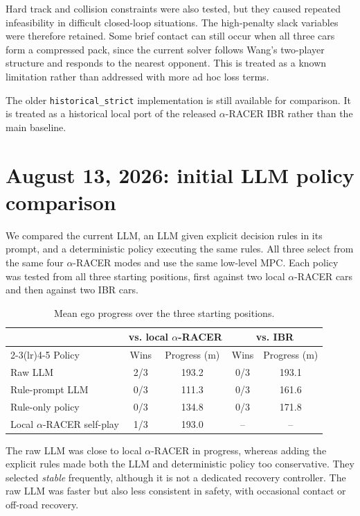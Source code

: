 \documentclass[11pt]{article}
\newcommand{\code}[1]{\texttt{#1}}
\begin{document}
Hard track and collision constraints were also tested, but they caused repeated
infeasibility in difficult closed-loop situations. The high-penalty slack
variables were therefore retained. Some brief contact can still occur when all
three cars form a compressed pack, since the current solver follows Wang's
two-player structure and responds to the nearest opponent. This is treated as a
known limitation rather than addressed with more ad hoc loss terms.

The older \code{historical\_strict} implementation is still available for
comparison. It is treated as a historical local port of the released
$\alpha$-RACER IBR rather than the main baseline.

\section{August 13, 2026: initial LLM policy comparison}

We compared the current LLM, an LLM given explicit decision rules in its
prompt, and a deterministic policy executing the same rules. All three select
from the same four $\alpha$-RACER modes and use the same low-level MPC. Each
policy was tested from all three starting positions, first against two local
$\alpha$-RACER cars and then against two IBR cars.

\begin{table}[ht]
  \centering
  \small
  \begin{tabular}{lcccc}
    \toprule
    & \multicolumn{2}{c}{vs. local $\alpha$-RACER}
    & \multicolumn{2}{c}{vs. IBR} \\
    \cmidrule(lr){2-3}\cmidrule(lr){4-5}
    Policy & Wins & Progress (m) & Wins & Progress (m) \\
    \midrule
    Raw LLM          & 2/3 & 193.2 & 0/3 & 193.1 \\
    Rule-prompt LLM  & 0/3 & 111.3 & 0/3 & 161.6 \\
    Rule-only policy & 0/3 & 134.8 & 0/3 & 171.8 \\
    Local $\alpha$-RACER self-play & 1/3 & 193.0 & -- & -- \\
    \bottomrule
  \end{tabular}
  \caption{Mean ego progress over the three starting positions.}
\end{table}

The raw LLM was close to local $\alpha$-RACER in progress, whereas adding the
explicit rules made both the LLM and deterministic policy too conservative.
They selected \emph{stable} frequently, although it is not a dedicated recovery
controller. The raw LLM was faster but also less consistent in safety, with
occasional contact or off-road recovery.
\end{document}
